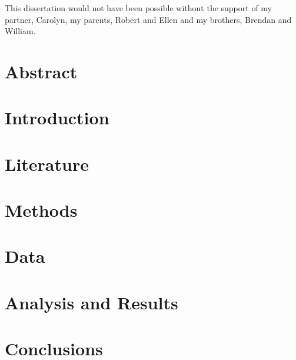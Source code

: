 \documentclass[hidelinks,11pt]{article} %
\begin{document}
This dissertation would not have been possible without the support of my partner, Carolyn, my parents, Robert and Ellen and my brothers, Brendan and William. 

\pagebreak

\section{Abstract} \label{abstract}


\pagebreak

\tableofcontents
\pagebreak

\listoffigures
\listoftables
\pagebreak

\section{Introduction} \label{introduction}

	

\section{Literature} \label{literature}

	

\section{Methods} \label{methods}

	


\section{Data} \label{data} 

	

\section{Analysis and Results}\label{analysis}

	


\section{Conclusions} \label{conclusions}

	


\pagebreak

%
%
%
%

\printbibliography
\end{document}
